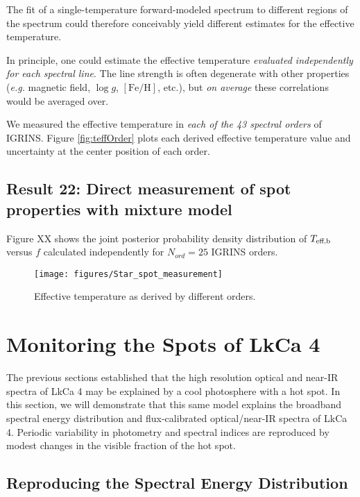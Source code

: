 \documentclass[onecolumn]{emulateapj}%
\begin{document}
The fit of a single-temperature forward-modeled spectrum to different regions of the spectrum could therefore conceivably yield different estimates for the effective temperature.

In principle, one could estimate the effective temperature \emph{evaluated independently for each spectral line}.  The line strength is often degenerate with other properties (\emph{e.g.} magnetic field, $\log{g}$, $[\mathrm{Fe}/\mathrm{H}]$, etc.), but \emph{on average} these correlations would be averaged over.

We measured the effective temperature in \emph{each of the 43 spectral orders} of IGRINS.  Figure \ref{fig:teffOrder} plots each derived effective temperature value and uncertainty at the center position of each order.

\subsection{Result 22: Direct measurement of spot properties with mixture model}

Figure XX shows the joint posterior probability density distribution of $T_\textrm{eff,b}$ versus $f$ calculated independently for $N_{ord}=25$ IGRINS orders.  


\begin{figure*}
	\centering
	\texttt{[image: figures/Star\_spot\_measurement]} 
	\caption{Effective temperature as derived by different orders.}
	\label{fig:StarspotProperties}
\end{figure*}


\section{Monitoring the Spots of LkCa 4}

The previous sections established that the high resolution optical and near-IR spectra of LkCa 4 may be explained by a cool photosphere with a hot spot.  In this section, we will demonstrate that this same model explains the broadband spectral energy distribution and flux-calibrated optical/near-IR spectra of LkCa 4.  Periodic variability in photometry and spectral indices are reproduced by modest changes in the visible fraction of the hot spot.

\subsection{Reproducing the Spectral Energy Distribution}
\end{document}
